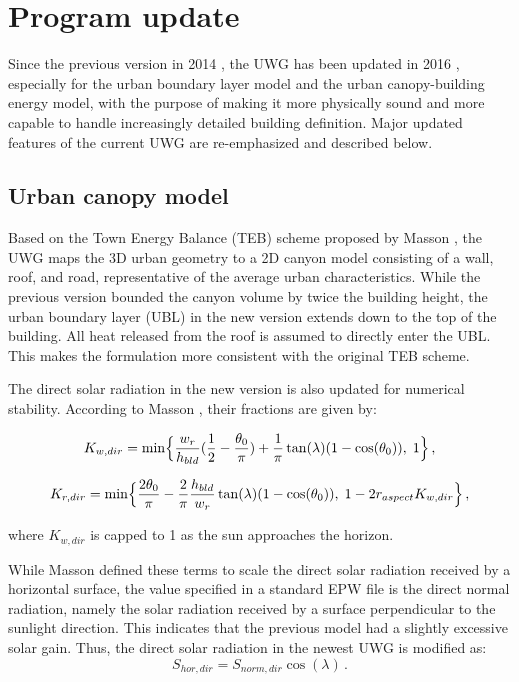 \section{Program update}

Since the previous version in 2014 \cite{bueno2014computationally}, the UWG has been updated in 2016 \cite{yang2016curious}, especially for the urban boundary layer model and the urban canopy-building energy model, with the purpose of making it more physically sound and more capable to handle increasingly detailed building definition. Major updated features of the current UWG are re-emphasized and described below.

\subsection{Urban canopy model}

Based on the Town Energy Balance (TEB) scheme proposed by Masson \cite{masson2000physically}, the UWG maps the 3D urban geometry to a 2D canyon model consisting of a wall, roof, and road, representative of the average urban characteristics. While the previous version bounded the canyon volume by twice the building height, the urban boundary layer (UBL) in the new version extends down to the top of the building. All heat released from the roof is assumed to directly enter the UBL. This makes the formulation more consistent with the original TEB scheme.

The direct solar radiation in the new version is also updated for numerical stability. According to Masson \cite{masson2000physically}, their fractions are given by:

\begin{equation}
K_{w,dir}=\min \Bigl\{ \frac{w_r}{h_{bld}} (\frac{1}{2} - \frac{\theta_0}{\pi}) + \frac{1}{\pi} \tan (\lambda)(1 - \cos (\theta_0)),\; 1 \Bigr\}\,,
\end{equation}

\begin{equation}
K_{r,dir}=\min \Bigl\{ \frac{2\theta_0}{\pi} - \frac{2}{\pi} \frac{h_{bld}}{w_r} \tan (\lambda)(1 - \cos (\theta_0)),\; 1 - 2 r_{aspect} K_{w,dir} \Bigr\}\,,
\end{equation}

\vspace{15pt}
\noindent where $K_{w,dir}$ is capped to 1 as the sun approaches the horizon.

While Masson defined these terms to scale the direct solar radiation received by a horizontal surface, the value specified in a standard EPW file is the direct normal radiation, namely the solar radiation received by a surface perpendicular to the sunlight direction. This indicates that the previous model had a slightly excessive solar gain. Thus, the direct solar radiation in the newest UWG is modified as:
\vspace{12pt}
\begin{equation}
S_{hor,dir} = S_{norm,dir} \cos (\lambda)\,.
\end{equation}

